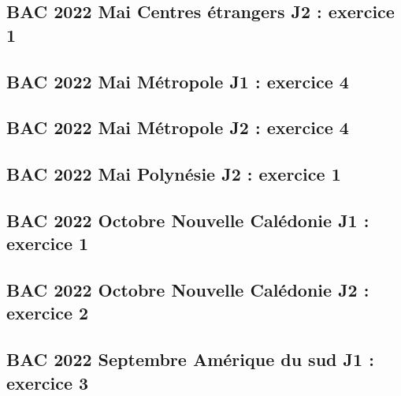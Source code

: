 \documentclass[lang=fr,edition=teacher,layout=sheet]{mxbook}
\begin{document}
\begingroup\endgroup
\par\bigskip
{}\subsection*{BAC 2022 Mai Centres étrangers J2 : exercice 1}
\begingroup\endgroup
\par\bigskip
{}\subsection*{BAC 2022 Mai Métropole J1 : exercice 4}
\begingroup\endgroup
\par\bigskip
{}\subsection*{BAC 2022 Mai Métropole J2 : exercice 4}
\begingroup\endgroup
\par\bigskip
{}\subsection*{BAC 2022 Mai Polynésie J2 : exercice 1}
\begingroup\endgroup
\par\bigskip
{}\subsection*{BAC 2022 Octobre Nouvelle Calédonie J1 : exercice 1}
\begingroup\endgroup
\par\bigskip
{}\subsection*{BAC 2022 Octobre Nouvelle Calédonie J2 : exercice 2}
\begingroup\endgroup
\par\bigskip
{}\subsection*{BAC 2022 Septembre Amérique du sud J1 : exercice 3}
\end{document}
